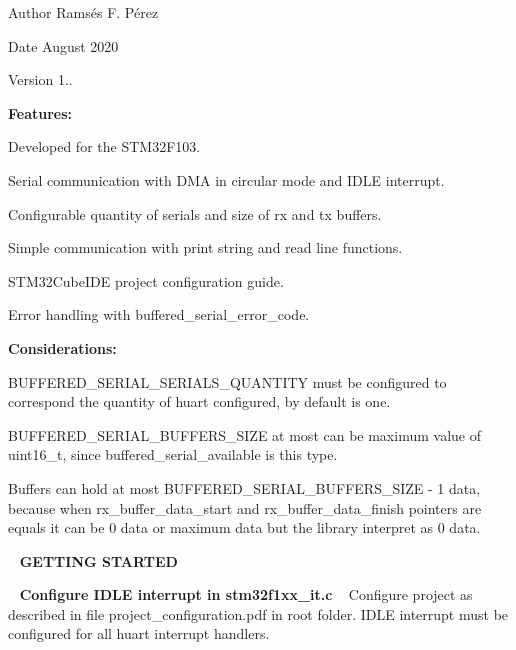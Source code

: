 \begin{DoxyAuthor}{Author}
Ramsés F. Pérez 
\end{DoxyAuthor}
\begin{DoxyDate}{Date}
August 2020 
\end{DoxyDate}
\begin{DoxyVersion}{Version}
1..
\end{DoxyVersion}
{\bfseries{Features\+:}}


\begin{DoxyItemize}
\item Developed for the S\+T\+M32\+F103.
\item Serial communication with D\+MA in circular mode and I\+D\+LE interrupt.
\item Configurable quantity of serials and size of rx and tx buffers.
\item Simple communication with print string and read line functions.
\item S\+T\+M32\+Cube\+I\+DE project configuration guide.
\item Error handling with buffered\+\_\+serial\+\_\+error\+\_\+code.
\end{DoxyItemize}

{\bfseries{Considerations\+:}}


\begin{DoxyItemize}
\item B\+U\+F\+F\+E\+R\+E\+D\+\_\+\+S\+E\+R\+I\+A\+L\+\_\+\+S\+E\+R\+I\+A\+L\+S\+\_\+\+Q\+U\+A\+N\+T\+I\+TY must be configured to correspond the quantity of huart configured, by default is one.
\item B\+U\+F\+F\+E\+R\+E\+D\+\_\+\+S\+E\+R\+I\+A\+L\+\_\+\+B\+U\+F\+F\+E\+R\+S\+\_\+\+S\+I\+ZE at most can be maximum value of uint16\+\_\+t, since buffered\+\_\+serial\+\_\+available is this type.
\item Buffers can hold at most B\+U\+F\+F\+E\+R\+E\+D\+\_\+\+S\+E\+R\+I\+A\+L\+\_\+\+B\+U\+F\+F\+E\+R\+S\+\_\+\+S\+I\+ZE -\/ 1 data, because when rx\+\_\+buffer\+\_\+data\+\_\+start and rx\+\_\+buffer\+\_\+data\+\_\+finish pointers are equals it can be 0 data or maximum data but the library interpret as 0 data.
\end{DoxyItemize}

~\newline
{\bfseries{G\+E\+T\+T\+I\+NG S\+T\+A\+R\+T\+ED}}

~\newline
{\bfseries{Configure I\+D\+LE interrupt in stm32f1xx\+\_\+it.\+c}} ~\newline
 Configure project as described in file project\+\_\+configuration.\+pdf in root folder. I\+D\+LE interrupt must be configured for all huart interrupt handlers.



